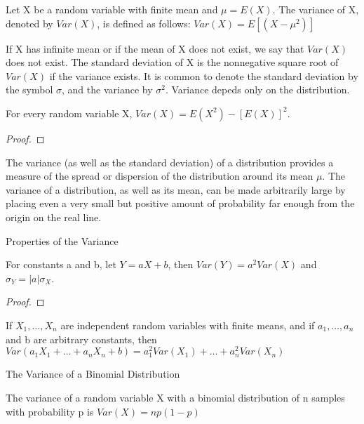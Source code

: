 \begin{definition}
Let X be a random variable with finite mean and $\mu=E\left(X\right)$. The variance of X, denoted by $Var\left(X\right)$, is defined as follows: $Var\left(X\right)=E\left[\left(X-\mu^{2}\right)\right]$
\end{definition}

{\color{red} If X has infinite mean or if the mean of X does not exist, we say that $Var\left(X\right)$ does not exist. The standard deviation of X is the nonnegative square root of $Var\left(X\right)$ if the variance exists. It is common to denote the standard deviation by the symbol $\sigma$, and the variance by $\sigma^{2}$. Variance depeds only on the distribution.}

\begin{proposition}
For every random variable X, $Var\left(X\right)=E\left(X^{2}\right)-\left[E\left(X\right)\right]^{2}$.
\end{proposition}
\begin{proof}
\end{proof}

{\color{red} The variance (as well as the standard deviation) of a distribution provides a measure of the spread or dispersion of the distribution around its mean $\mu$. The variance of a distribution, as well as its mean, can be made arbitrarily large by placing even a very small but positive amount of probability far enough from the origin on the real line.}

Properties of the Variance

\begin{proposition}
For constants a and b, let $Y=aX+b$, then $Var\left(Y\right)=a^{2}Var\left(X\right)$
and $\sigma_{Y}=\left|a\right|\sigma_{X}$.
\end{proposition}
\begin{proof}
\end{proof}

{\color{red} If $X_{\text{1}},\ldots,X_{n}$ are independent random variables with finite means, and if $a_{1},\ldots,a_{n}$ and b are arbitrary constants, then $Var\left(a_{1}X_{1}+\ldots+a_{n}X_{n}+b\right)=a_{1}^{2}Var\left(X_{1}\right)+\ldots+a_{n}^{2}Var\left(X_{n}\right)$}

\begin{example}
The Variance of a Binomial Distribution

The variance of a random variable X with a binomial distribution of n samples with probability p is $Var\left(X\right)=np\left(1-p\right)$
\end{example}



